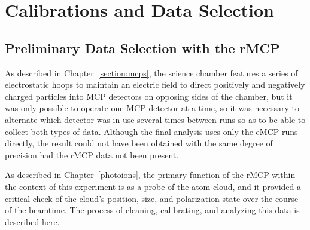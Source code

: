 %
%
%
\clearpage
\chapter{Calibrations and Data Selection}
\label{calibrations_chapter}
\label{dataselection_chapter}


\section{Preliminary Data Selection with the rMCP}
\label{sec:rmcp}

As described in Chapter~\ref{section:mcps}, the science chamber features a series of electrostatic hoops to maintain an electric field to direct positively and negatively charged particles into MCP detectors on opposing sides of the chamber, but it was only possible to operate one MCP detector at a time, so it was necessary to alternate which detector was in use several times between runs so as to be able to collect both types of data.  Although the final analysis uses only the eMCP runs directly, the result could not have been obtained with the same degree of precision had the rMCP data not been present.  

As described in Chapter~\ref{photoions}, the primary function of the rMCP within the context of this experiment is as a probe of the atom cloud, and it provided a critical check of the cloud's position, size, and polarization state over the course of the beamtime.  The process of cleaning, calibrating, and analyzing this data is described here.  

